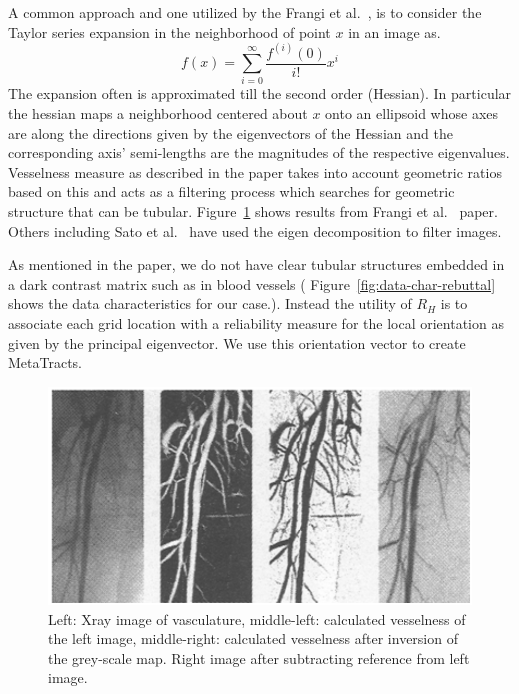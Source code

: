 \documentclass[]{article}
\begin{document}
A common approach and one utilized by the Frangi et al.~\cite{Frangi1998}, is to consider the Taylor series expansion in the neighborhood of point $x$ in an image as.
\begin{equation}
f(x) = \sum_{i=0}^{\infty}\frac{f^{(i)}(0)}{i!}x^{i}
\end{equation}
The expansion often is approximated till the second order (Hessian). In particular the hessian maps a  neighborhood  centered about $x$ onto an ellipsoid  whose axes are along the directions given by the eigenvectors of the Hessian and the corresponding axis' semi-lengths are the magnitudes of the respective eigenvalues. Vesselness measure as described in the paper takes into account geometric ratios based on this and acts as a filtering process which searches for geometric structure that can be tubular. Figure~\ref{fig:Vesselness} shows results from Frangi et al.~\cite{Frangi1998} paper. Others including Sato et al.~\cite{Sato1997} have used the eigen decomposition to filter images.

As mentioned in the paper, we do not have clear tubular structures embedded in a dark contrast matrix such as in blood vessels ( Figure~\ref{fig:data-char-rebuttal} shows the data characteristics for our case.). Instead  the utility of $R_{H}$ is  to associate each grid location with a reliability measure for the local orientation as given by the  principal eigenvector. We use this orientation vector to create MetaTracts.
\makebox[\linewidth]{\rule{0.25\textwidth}{0.4pt}}

\begin{figure}
\centering
\includegraphics[width=0.7\linewidth]{images_pvis/Vesselness}
\caption{Left: Xray image of vasculature, middle-left: calculated vesselness of the left image, middle-right: calculated vesselness after inversion of the grey-scale map. Right image after subtracting reference from left image.}
\label{fig:Vesselness}
\end{figure}
\end{document}
